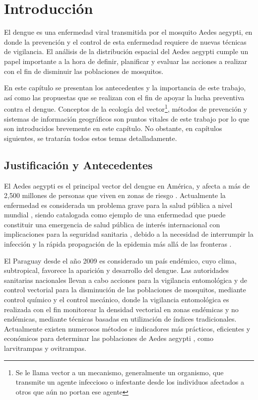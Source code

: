\chapter{Introducción}

El dengue es una enfermedad viral transmitida por el mosquito Aedes aegypti, en donde la
prevención y el control de esta enfermedad requiere de nuevas técnicas de vigilancia. El análisis
de la distribución espacial del Aedes aegypti cumple un papel importante a la hora de definir,
planificar y evaluar las acciones a realizar con el fin de disminuir las poblaciones de mosquitos.

En este capítulo se presentan los antecedentes y la importancia de este trabajo, así como las
propuestas que se realizan con el fin de apoyar la lucha preventiva contra el dengue. Conceptos de
la ecología del vector\footnote{Se le llama vector a un mecanismo, generalmente un organismo, que
transmite un agente infeccioso o infestante desde los individuos afectados a otros que aún no
portan ese agente}, métodos de prevención y sistemas de información geográficos son puntos
vitales de este trabajo por lo que son introducidos brevemente en este capítulo. No obstante, en
capítulos siguientes, se tratarán todos estos temas detalladamente.

\section{Justificación y Antecedentes}
El Aedes aegypti es el principal vector del dengue en América, y afecta a más de 2,500 millones
de personas que viven en zonas de riesgo \cite{world2009dengue, gustavo2006dengue}. Actualmente la enfermedad es considerada un problema grave para la salud pública a nivel mundial
\cite{dengueUruguayCap1, world2009dengue, DIBO2005}, siendo catalogada como ejemplo de una
enfermedad que puede constituir una emergencia de salud pública de interés internacional con
implicaciones para la seguridad sanitaria \cite{dengueUruguayCap1, world2009dengue}, debido a la
necesidad de interrumpir la infección y la rápida propagación de la epidemia más allá de las
fronteras \cite{world2009dengue}.

El Paraguay desde el año 2009 es considerado un país endémico\cite{planControlMspbs2014}, cuyo
clima, subtropical, favorece la aparición y desarrollo del dengue. Las autoridades sanitarias
nacionales llevan a cabo acciones para la vigilancia entomológica y de control vectorial para la
disminución de las poblaciones de mosquitos, mediante control químico y el control mecánico, donde
la vigilancia entomológica es realizada con el fin monitorear la densidad vectorial en zonas
endémicas y no endémicas, mediante técnicas basadas en utilización de índices tradicionales.
Actualmente existen numerosos métodos e indicadores más prácticos, eficientes y económicos para
determinar las poblaciones de Aedes aegypti \cite{cenaprece2013}, como larvitrampas y ovitrampas.

